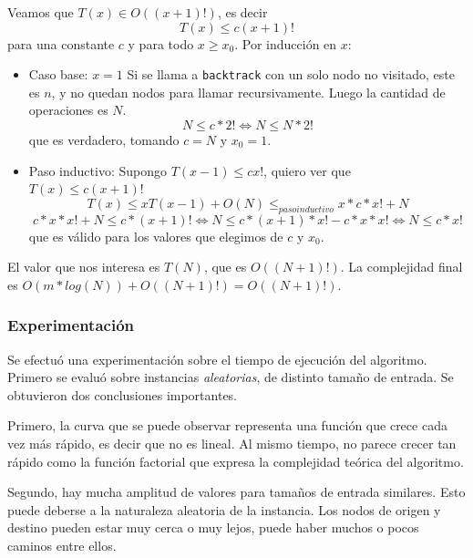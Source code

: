 Veamos que $T(x) \in O((x+1)!)$, es decir
\[
    T(x) \leq c(x+1)!
\]
para una constante $c$ y para todo $x \geq x_0$. Por inducción en $x$:
\begin{itemize}
    \item Caso base: $x=1$
        Si se llama a \texttt{backtrack} con un solo nodo no visitado, este es $n$, y no quedan nodos para llamar recursivamente. Luego la cantidad de operaciones es $N$.
        \[
            N \leq c*2! \Leftrightarrow N \leq N*2!
        \]
        que es verdadero, tomando $c = N$ y $x_0 = 1$.
    \item Paso inductivo: Supongo $T(x-1) \leq cx!$, quiero ver que $T(x) \leq c(x+1)!$
        \[
            T(x) \leq x T(x-1) + O(N) \leq_{paso inductivo} x*c*x! + N
        \]
        \[
            c*x*x! + N \leq c*(x+1)! \Leftrightarrow N \leq c*(x+1)*x! - c*x*x! \Leftrightarrow N \leq c*x!
        \]
        que es válido para los valores que elegimos de $c$ y $x_0$.
\end{itemize}

El valor que nos interesa es $T(N)$, que es $O((N+1)!)$. La complejidad final es $O(m*log(N)) + O((N+1)!) = O((N+1)!)$.

\newpage
\subsubsection{Experimentación}

Se efectuó una experimentación sobre el tiempo de ejecución del algoritmo. Primero se evaluó sobre instancias \textit{aleatorias}, de distinto tamaño de entrada. Se obtuvieron dos conclusiones importantes.

Primero, la curva que se puede observar representa una función que crece cada vez más rápido, es decir que no es lineal. Al mismo tiempo, no parece crecer tan rápido como la función factorial que expresa la complejidad teórica del algoritmo.

Segundo, hay mucha amplitud de valores para tamaños de entrada similares. Esto puede deberse a la naturaleza aleatoria de la instancia. Los nodos de origen y destino pueden estar muy cerca o muy lejos, puede haber muchos o pocos caminos entre ellos.

